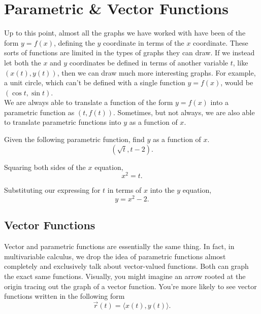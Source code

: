 \section{Parametric \& Vector Functions}
Up to this point, almost all the graphs we have worked with have been of the form $y=f(x)$, defining the $y$ coordinate in terms of the $x$ coordinate.
These sorts of functions are limited in the types of graphs they can draw.
If we instead let both the $x$ and $y$ coordinates be defined in terms of another variable $t$, like $(x(t),y(t))$, then we can draw much more interesting graphs.
For example, a unit circle, which can't be defined with a single function $y=f(x)$, would be $(\cos{t}, \sin{t})$. \\


We are always able to translate a function of the form $y=f(x)$ into a parametric function as $(t, f(t))$.
Sometimes, but not always, we are also able to translate parametric functions into $y$ as a function of $x$.

\begin{example}
	Given the following parametric function, find $y$ as a function of $x$.
	\begin{equation*}
		(\sqrt{t}, t-2).
	\end{equation*}
\end{example}
\begin{answer}
	Squaring both sides of the $x$ equation,
	\begin{equation*}
		x^2 = t.
	\end{equation*}
	
	Substituting our expressing for $t$ in terms of $x$ into the $y$ equation,
	\begin{equation*}
		y = x^2 - 2.
	\end{equation*}
\end{answer}

\subsection{Vector Functions}
Vector and parametric functions are essentially the same thing.
In fact, in multivariable calculus, we drop the idea of parametric functions almost completely and exclusively talk about vector-valued functions.
Both can graph the exact same functions.
Visually, you might imagine an arrow rooted at the origin tracing out the graph of a vector function. 
You're more likely to see vector functions written in the following form
\begin{equation*}
	\vec{r}(t) = \langle x(t), y(t) \rangle.
\end{equation*}


